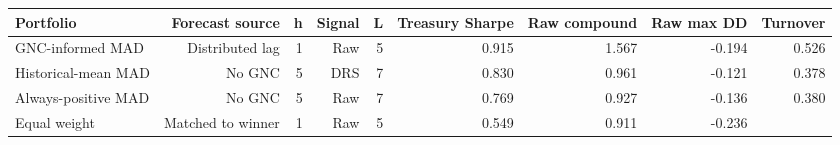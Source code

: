 \begin{tabular}{lrrrrrrrr}
\toprule
Portfolio & Forecast source & h & Signal & L & Treasury Sharpe & Raw compound & Raw max DD & Turnover \\
\midrule
GNC-informed MAD & Distributed lag & 1 & Raw & 5 & 0.915 & 1.567 & -0.194 & 0.526 \\
Historical-mean MAD & No GNC & 5 & DRS & 7 & 0.830 & 0.961 & -0.121 & 0.378 \\
Always-positive MAD & No GNC & 5 & Raw & 7 & 0.769 & 0.927 & -0.136 & 0.380 \\
Equal weight & Matched to winner & 1 & Raw & 5 & 0.549 & 0.911 & -0.236 &  \\
\bottomrule
\end{tabular}
